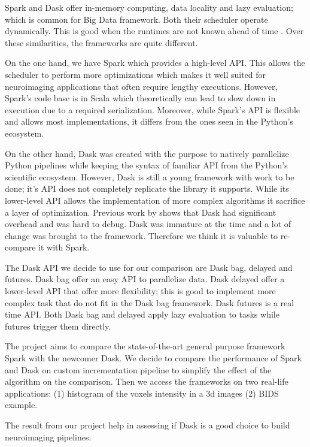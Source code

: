 \documentclass[11pt,a4paper]{article}
\begin{document}
Spark and Dask offer in-memory computing, data locality and lazy evaluation; which is
common for Big Data framework. Both their scheduler operate dynamically. This is good
when the runtimes are not known ahead of time \citep{Dask:15}. Over these
similarities, the frameworks are quite different.

On the one hand, we have Spark which provides a high-level API. This allows the
scheduler to perform more optimizations which makes it well suited for neuroimaging
applications that often require lengthy executions. However, Spark's code base is in
Scala which theoretically can lead to slow down in execution due to a required
serialization. Moreover, while Spark's API is flexible and allows most
implementations, it differs from the ones seen in the Python's ecosystem.

On the other hand, Dask was created with the purpose to natively parallelize Python
pipelines while keeping the syntax of familiar API from the Python's scientific
ecosystem. However, Dask is still a young framework with work to be done; it's API
does not completely replicate the library it supports. While its lower-level API
allows the implementation of more complex algorithms it sacrifice a layer of
optimization.
Previous work by \citet{Mehta:17} shows that Dask had significant overhead and was
hard to debug.
Dask was immature at the time and a lot of change was brought to the framework.
Therefore we think it is valuable to re-compare it with Spark.

The Dask API we decide to use for our comparison are Dask bag, delayed and futures.
Dask bag offer an easy API to parallelize data. Dask delayed offer a lower-level API
that offer more flexibility; this is good to implement more complex task that do not
fit in the Dask bag framework. Dask futures is a real time API. Both Dask bag and
delayed apply lazy evaluation to tasks while futures trigger them directly.

The project aims to compare the state-of-the-art general purpose framework Spark with
the newcomer Dask. We decide to compare the performance of Spark and Dask on custom
incrementation pipeline to simplify the effect of the algorithm on the comparison.
Then we access the frameworks on two real-life applications: (1) histogram of the
voxels intensity in a 3d images (2) BIDS example.

The result from our project help in assessing if Dask is a good choice to build
neuroimaging pipelines.
\end{document}
